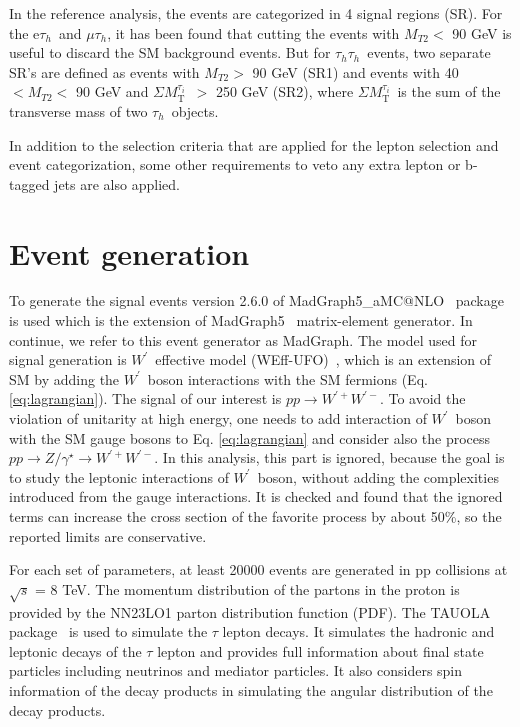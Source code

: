 \documentclass[preprint,showpacs,preprintnumbers]{revtex4}
\newcommand{\wprime}{\ensuremath{W^\prime}~}
\newcommand{\wprimep}{\ensuremath{W^{\prime+}}}
\newcommand{\wprimem}{\ensuremath{W^{\prime-}}}
\newcommand{\Tau}{\ensuremath{\tau_h}}
\newcommand{\tauTau}{\ensuremath{\tau_h\tau_h}}
\newcommand{\mttwo}{\ensuremath{M_{T2}}}
\newcommand{\SumMT}{ \ensuremath{\Sigma M_\mathrm{T}^{\tau_i}}~}
\begin{document}
In the reference analysis, the events are categorized in 4 signal regions (SR). For the e\Tau ~and $\mu\Tau$, it has been found that cutting the events with $\mttwo <$ 90 GeV is useful to discard the SM background events. But for \tauTau ~events, two separate SR's are defined as events with $\mttwo>$ 90 GeV (SR1) and events with 40 $<\mttwo<$ 90 GeV  and \SumMT $>$ 250 GeV (SR2), where \SumMT is the sum of the transverse mass of two \Tau ~objects.

In addition to the selection criteria that are applied for the lepton selection and event categorization, some other requirements to veto any extra lepton or b-tagged jets  are also applied. 

\section{Event generation}\label{sec:simulation}
To generate the signal events version 2.6.0 of   MadGraph5\_aMC@NLO~\cite{Alwall:2014hca} package is used which is the extension of MadGraph5~\cite{Alwall:2011uj} matrix-element generator. In continue, we refer to this event generator  as MadGraph.
The model used for signal generation is \wprime effective model (WEff-UFO)~\cite{Sullivan:2002jt}, which  is an extension of SM by adding the \wprime boson interactions with the SM fermions (Eq. \ref{eq:lagrangian}). The signal of our interest is $ pp\rightarrow \wprimep \wprimem$. 
To avoid the violation of unitarity at high energy, one needs to add interaction of \wprime boson with the SM gauge bosons to Eq. \ref{eq:lagrangian} and consider also the process $pp\rightarrow Z/\gamma^{\star} \rightarrow \wprimep \wprimem$. In this analysis, this part is ignored, because the goal is to study the leptonic interactions of \wprime boson, without adding the complexities introduced from the gauge interactions. It is checked and found that the ignored terms can increase the cross section of the favorite process by about 50\%, so the reported limits are conservative.

For each set of parameters, at least 20000 events are generated in pp collisions at $\sqrt{s}$ = 8 TeV. 
The momentum distribution of the partons in the proton is provided by the NN23LO1 \cite{Ball:2013hta} parton distribution function (PDF). The TAUOLA package~\cite{Davidson:2010rw} is used to simulate the $\tau$ lepton decays. It simulates the hadronic and leptonic decays of the $\tau$ lepton and provides full information about final state particles including neutrinos and mediator particles. It also considers spin information of the decay products in simulating the angular distribution of the decay products.
\end{document}
